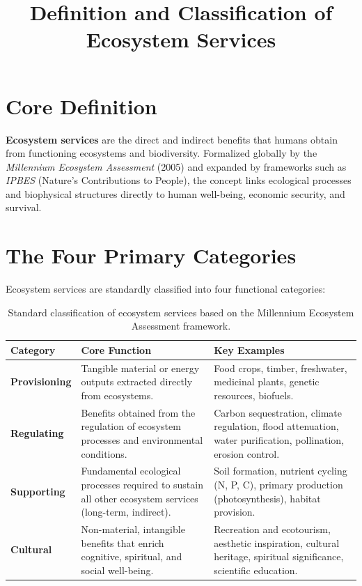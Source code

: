 \documentclass[11pt,a4paper]{article}
\title{\textbf{Definition and Classification of Ecosystem Services}}
\author{}
\date{}
\begin{document}
\maketitle

\section{Core Definition}
\textbf{Ecosystem services} are the direct and indirect benefits that humans obtain from functioning ecosystems and biodiversity. Formalized globally by the \textit{Millennium Ecosystem Assessment} (2005) and expanded by frameworks such as \textit{IPBES} (Nature's Contributions to People), the concept links ecological processes and biophysical structures directly to human well-being, economic security, and survival.

\section{The Four Primary Categories}
Ecosystem services are standardly classified into four functional categories:

\begin{table}[h!]
\centering
\renewcommand{\arraystretch}{1.35}
\begin{tabularx}{\textwidth}{>{\bfseries}l X X}
\toprule
Category & Core Function & Key Examples \\
\midrule
Provisioning & Tangible material or energy outputs extracted directly from ecosystems. & Food crops, timber, freshwater, medicinal plants, genetic resources, biofuels. \\
Regulating & Benefits obtained from the regulation of ecosystem processes and environmental conditions. & Carbon sequestration, climate regulation, flood attenuation, water purification, pollination, erosion control. \\
Supporting & Fundamental ecological processes required to sustain all other ecosystem services (long-term, indirect). & Soil formation, nutrient cycling (N, P, C), primary production (photosynthesis), habitat provision. \\
Cultural & Non-material, intangible benefits that enrich cognitive, spiritual, and social well-being. & Recreation and ecotourism, aesthetic inspiration, cultural heritage, spiritual significance, scientific education. \\
\bottomrule
\end{tabularx}
\caption{Standard classification of ecosystem services based on the Millennium Ecosystem Assessment framework.}
\end{table}
\end{document}
